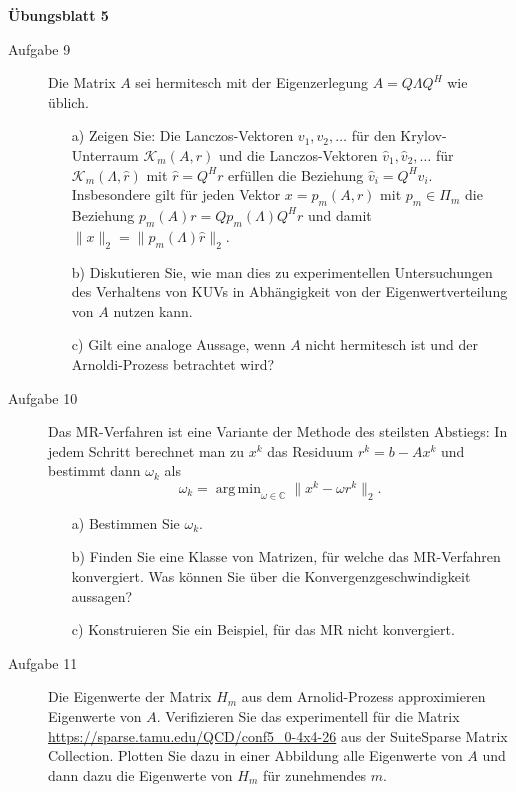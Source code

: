 \documentclass[a4paper,11pt]{scrartcl}
\DeclareMathOperator*{\argmin}{arg\,min}
\begin{document}
\aihead

\begin{center}
  {\large\textbf{Übungsblatt 5}}
\end{center}


\begin{description}
\item[Aufgabe 9] Die Matrix $A$ sei hermitesch mit der Eigenzerlegung $A = Q\Lambda Q^H$ wie üblich. 
 \begin{enumerate}
 \item[a)] Zeigen Sie: Die Lanczos-Vektoren $v_1,v_2,\ldots$ für den Krylov-Unterraum $\mathcal{K}_m(A,r)$ und die Lanczos-Vektoren $\hat v_1,\hat v_2,\ldots$ für  $\mathcal{K}_m(\Lambda,\hat r)$ mit $\hat r = Q^Hr$ erfüllen die Beziehung $\hat v_i = Q^H v_i$. Insbesondere gilt für jeden Vektor $x = p_m(A,r)$ mit $p_m \in \Pi_m$ die Beziehung $p_m(A)r = Qp_m(\Lambda)Q^Hr$ und damit $\|x\|_2 = \| p_m(\Lambda)\hat r\|_2$. 
 \item[b)] Diskutieren Sie, wie man dies zu experimentellen Untersuchungen des Verhaltens von KUVs in Abhängigkeit von der Eigenwertverteilung von $A$ nutzen kann. 
 \item[c)] Gilt eine analoge Aussage, wenn $A$ nicht hermitesch ist und der Arnoldi-Prozess betrachtet wird?
 \end{enumerate} 
 
\item[Aufgabe 10] Das MR-Verfahren ist eine Variante der Methode des steilsten Abstiegs: In jedem Schritt berechnet man zu $x^k$ das Residuum $r^k = b-Ax^k$ und bestimmt dann $\omega_k$ als 
 \[
 \omega_k = \argmin_{\omega \in \mathbb{C}} \|x^k - \omega r^k\|_2.
 \]
 \begin{enumerate}
 \item[a)] Bestimmen Sie $\omega_k$.
 \item[b)] Finden Sie eine Klasse von Matrizen, für welche das MR-Verfahren konvergiert. Was können Sie über die Konvergenzgeschwindigkeit aussagen?
 \item[c)] Konstruieren Sie ein Beispiel, für das MR nicht konvergiert.
 \end{enumerate}

 \item[Aufgabe 11] Die Eigenwerte der Matrix $H_m$ aus dem Arnolid-Prozess approximieren Eigenwerte von $A$. Verifizieren Sie das experimentell für die Matrix  \url{https://sparse.tamu.edu/QCD/conf5_0-4x4-26} aus der SuiteSparse Matrix Collection. Plotten Sie dazu in einer Abbildung alle Eigenwerte von $A$ und dann dazu die Eigenwerte von $H_m$ für zunehmendes $m$.
 
 
       
\end{description}
\end{document}

